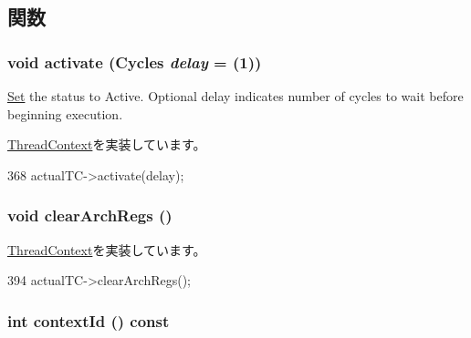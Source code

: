 \subsection{関数}
\hypertarget{classProxyThreadContext_ab542a5cf9ce4b41042d61e42dfe3aeab}{
\subsubsection[{activate}]{\setlength{\rightskip}{0pt plus 5cm}void activate ({\bf Cycles} {\em delay} = {(1)})}}
\label{classProxyThreadContext_ab542a5cf9ce4b41042d61e42dfe3aeab}
\hyperlink{classSet}{Set} the status to Active. Optional delay indicates number of cycles to wait before beginning execution. 

\hyperlink{classThreadContext_a9270160e6cce25ded6999f6e4e60a3ed}{ThreadContext}を実装しています。


\begin{DoxyCode}
368     { actualTC->activate(delay); }
\end{DoxyCode}
\hypertarget{classProxyThreadContext_ad5c88ea41846742bd8c70d9c50f31945}{
\subsubsection[{clearArchRegs}]{\setlength{\rightskip}{0pt plus 5cm}void clearArchRegs ()}}
\label{classProxyThreadContext_ad5c88ea41846742bd8c70d9c50f31945}


\hyperlink{classThreadContext_ae0375c0a094eeb6fe8f73db4393d4ceb}{ThreadContext}を実装しています。


\begin{DoxyCode}
394 { actualTC->clearArchRegs(); }
\end{DoxyCode}
\hypertarget{classProxyThreadContext_a651d5d14e7a4e95ebe6d7f5b8ee5a107}{
\subsubsection[{contextId}]{\setlength{\rightskip}{0pt plus 5cm}int contextId () const}}
\label{classProxyThreadContext_a651d5d14e7a4e95ebe6d7f5b8ee5a107}



